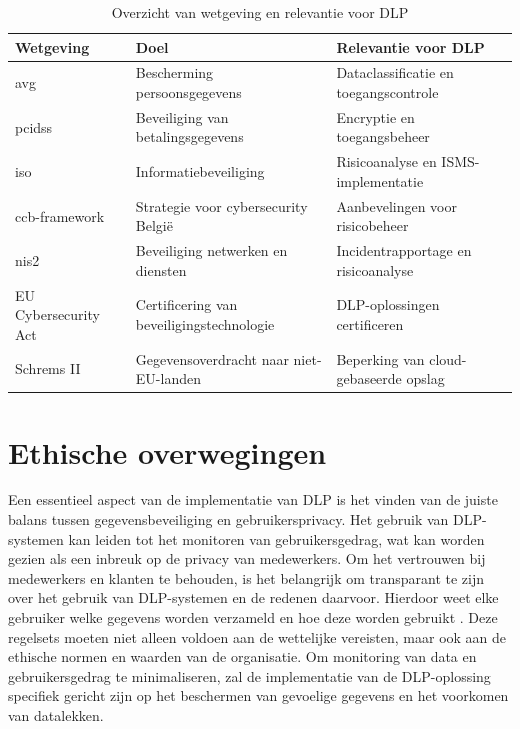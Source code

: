   
  \begin{table}[h]
    \centering
    \small
    \scriptsize
    \begin{tabular}{p{4cm} p{5cm} p{6cm}}
        \toprule
        \textbf{Wetgeving} & \textbf{Doel} & \textbf{Relevantie voor DLP} \\
        \midrule
        \gls{avg} & Bescherming persoonsgegevens & Dataclassificatie en toegangscontrole \\
        \gls{pcidss} & Beveiliging van betalingsgegevens & Encryptie en toegangsbeheer \\
        \gls{iso} & Informatiebeveiliging & Risicoanalyse en ISMS-implementatie \\
        \gls{ccb}-framework & Strategie voor cybersecurity België & Aanbevelingen voor risicobeheer \\
        \gls{nis2} & Beveiliging netwerken en diensten & Incidentrapportage en risicoanalyse \\
        EU Cybersecurity Act & Certificering van beveiligingstechnologie & DLP-oplossingen certificeren \\
        Schrems II & Gegevensoverdracht naar niet-EU-landen & Beperking van cloud-gebaseerde opslag \\
        \bottomrule
    \end{tabular}
    \caption{Overzicht van wetgeving en relevantie voor DLP}
    \label{tab:wetgeving_dlp}
\end{table}


  

\section{Ethische overwegingen}%

Een essentieel aspect van de implementatie van DLP is het vinden van de juiste balans tussen gegevensbeveiliging en gebruikersprivacy. 
Het gebruik van DLP-systemen kan leiden tot het monitoren van gebruikersgedrag, wat kan worden gezien als een inbreuk op de privacy van medewerkers. 
Om het vertrouwen bij medewerkers en klanten te behouden, is het belangrijk om transparant te zijn over het gebruik van DLP-systemen en de redenen daarvoor. 
Hierdoor weet elke gebruiker welke gegevens worden verzameld en hoe deze worden gebruikt \autocite{Zaini2024}. 
Deze regelsets moeten niet alleen voldoen aan de wettelijke vereisten, maar ook aan de ethische normen en waarden van de organisatie. 
Om monitoring van data en gebruikersgedrag te minimaliseren, 
zal de implementatie van de DLP-oplossing specifiek gericht zijn op het beschermen van gevoelige gegevens en het voorkomen van datalekken. 

